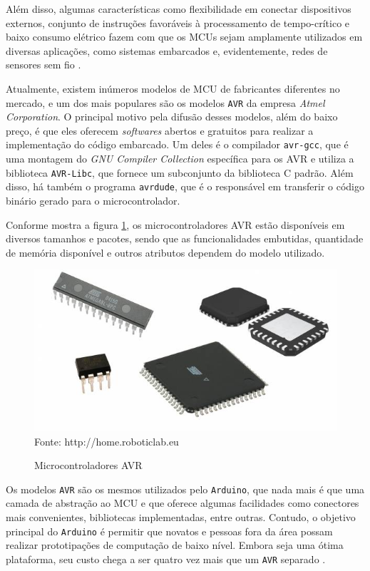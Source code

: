 Além disso, algumas características como flexibilidade em conectar dispositivos externos, conjunto de
instruções favoráveis à processamento de tempo-crítico e baixo consumo elétrico fazem com que os MCUs sejam
amplamente utilizados em diversas aplicações, como sistemas embarcados e, evidentemente, redes de sensores sem
fio \cite{karl_willig2005}.

Atualmente, existem inúmeros modelos de MCU de fabricantes diferentes no mercado, e um dos mais populares são
os modelos \texttt{AVR} da empresa \textit{Atmel Corporation}. O principal motivo pela difusão desses modelos,
além do baixo preço, é que eles oferecem \textit{softwares} abertos e gratuitos para realizar a implementação
do código embarcado. Um deles é o compilador \texttt{avr-gcc}, que é uma montagem do \textit{GNU Compiler Collection}
específica para os AVR e utiliza a biblioteca \texttt{AVR-Libc}, que fornece um subconjunto da biblioteca C
padrão. Além disso, há também o programa \texttt{avrdude}, que é o responsável em transferir o código binário
gerado para o microcontrolador.

Conforme mostra a figura \ref{figura:avr}, os microcontroladores AVR estão disponíveis em diversos tamanhos e
pacotes, sendo que as funcionalidades embutidas, quantidade de memória disponível e outros atributos dependem
do modelo utilizado.

\begin{figure}[h]
	\caption{Microcontroladores AVR}
	\centering
	\includegraphics[scale=0.5]{../images/avr.jpg}
	\hspace{\linewidth}
	Fonte: http://home.roboticlab.eu
	\label{figura:avr}
\end{figure}

Os modelos \texttt{AVR} são os mesmos utilizados pelo \texttt{Arduino}, que nada mais é que uma camada de
abstração ao MCU e que oferece algumas facilidades como conectores mais convenientes, bibliotecas
implementadas, entre outras.  Contudo, o objetivo principal do \texttt{Arduino} é permitir que novatos e
pessoas fora da área possam realizar prototipações de computação de baixo nível. Embora seja uma ótima
plataforma, seu custo chega a ser quatro vez mais que um \texttt{AVR} separado \cite{trevennor2012}.


